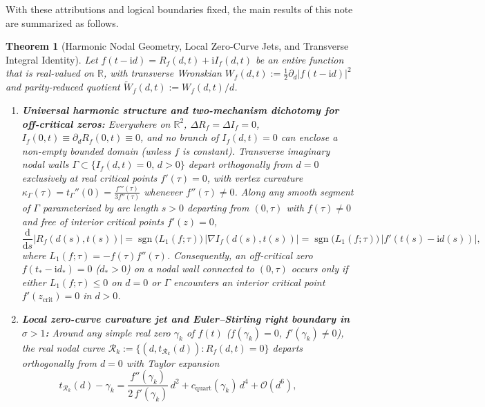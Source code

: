 \documentclass[11pt,a4paper,reqno]{amsart}
\newtheorem{theorem}{Theorem}[section]
\theoremstyle{definition}
\theoremstyle{remark}
\numberwithin{equation}{section}
\newcommand{\dd}{\mathrm{d}}
\newcommand{\ii}{\mathrm{i}}
\newcommand{\Wtil}{\widetilde{W}}
\begin{document}
With these attributions and logical boundaries fixed, the main results of this note are summarized as follows.

\begin{theorem}[Harmonic Nodal Geometry, Local Zero-Curve Jets, and Transverse Integral Identity]\label{thm:main}
Let $f(t-\ii d) = R_f(d,t) + \ii I_f(d,t)$ be an entire function that is real-valued on $\mathbb{R}$, with transverse Wronskian $W_f(d,t) := \frac{1}{2}\partial_d|f(t-\ii d)|^2$ and parity-reduced quotient $\Wtil_f(d,t) := W_f(d,t)/d$.
\begin{enumerate}
\item[\textup{(i)}] \textbf{Universal harmonic structure and two-mechanism dichotomy for off-critical zeros:} Everywhere on $\mathbb{R}^2$, $\Delta R_f = \Delta I_f = 0$, $I_f(0,t) \equiv \partial_d R_f(0,t) \equiv 0$, and no branch of $I_f(d,t) = 0$ can enclose a non-empty bounded domain (unless $f$ is constant). Transverse imaginary nodal walls $\Gamma \subset \{I_f(d,t) = 0,\, d > 0\}$ depart orthogonally from $d = 0$ exclusively at real critical points $f'(\tau) = 0$, with vertex curvature $\kappa_\Gamma(\tau) = t_\Gamma''(0) = \frac{f'''(\tau)}{3f''(\tau)}$ whenever $f''(\tau) \neq 0$. Along any smooth segment of $\Gamma$ parameterized by arc length $s > 0$ departing from $(0,\tau)$ with $f(\tau) \neq 0$ and free of interior critical points $f'(z) = 0$,
\begin{equation}\label{eq:cr_monotone_thm}
\frac{\dd}{\dd s}\big|R_f(d(s), t(s))\big| = \operatorname{sgn}\big(L_1(f;\tau)\big)\,\big|\nabla I_f(d(s), t(s))\big| = \operatorname{sgn}\big(L_1(f;\tau)\big)\,\big|f'(t(s) - \ii d(s))\big|,
\end{equation}
where $L_1(f;\tau) = -f(\tau)f''(\tau)$. Consequently, an off-critical zero $f(t_* - \ii d_*) = 0$ ($d_* > 0$) on a nodal wall connected to $(0,\tau)$ occurs only if either $L_1(f;\tau) \le 0$ on $d = 0$ or $\Gamma$ encounters an interior critical point $f'(z_{\mathrm{crit}}) = 0$ in $d > 0$.
\item[\textup{(ii)}] \textbf{Local zero-curve curvature jet and Euler--Stirling right boundary in $\sigma > 1$:} Around any simple real zero $\gamma_k$ of $f(t)$ ($f(\gamma_k) = 0$, $f'(\gamma_k) \neq 0$), the real nodal curve $\mathcal{R}_k := \{(d, t_{\mathcal{R}_k}(d)) : R_f(d,t) = 0\}$ departs orthogonally from $d = 0$ with Taylor expansion
\begin{equation}\label{eq:parabolic_curv_thm}
t_{\mathcal{R}_k}(d) - \gamma_k = \frac{f''(\gamma_k)}{2\,f'(\gamma_k)}\,d^2 + c_{\mathrm{quart}}(\gamma_k)\,d^4 + \mathcal{O}(d^6), \qquad

\end{equation}
\end{enumerate}
\end{theorem}
\end{document}
